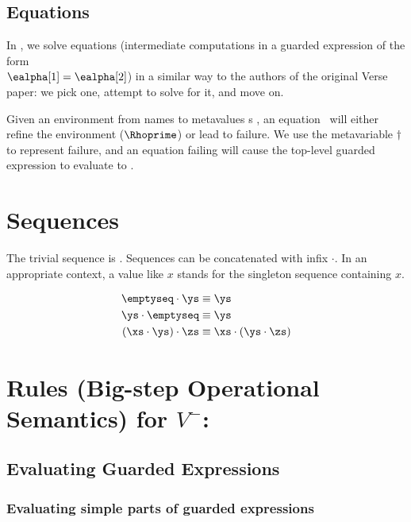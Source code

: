 \documentclass[]{article}
\begin{document}
    \bigskip
\subsection{Equations}

In \Vminus, we solve equations (intermediate computations in a guarded
expression of the form \\$\ealpha[1] = \ealpha[2]$) in a similar way to the
authors of the original Verse paper: we pick one, attempt to solve for it, and
move on. 


Given an environment from names to metavalues {\valpha}s \Rho, an equation \eq
~will either refine the environment ($\Rhoprime$) or lead to failure. We use
the metavariable $\dagger$ to represent failure, and an equation failing will
cause the top-level guarded expression to evaluate to \reject. 

{}\eqfail
    
    
    \section{Sequences}
    
    The trivial sequence is \emptyseq. Sequences can be concatenated with infix 
$\cdot$. In an appropriate context, a value like $x$ stands for 
the singleton sequence containing $x$. 

\begin{align*}
    \emptyseq \cdot \ys &\equiv \ys \\
    \ys \cdot \emptyseq &\equiv \ys \\
    (\xs \cdot \ys) \cdot \zs &\equiv \xs \cdot (\ys \cdot \zs)
\end{align*}

\section{Rules (Big-step Operational Semantics) for $V^{-}$:}
    
\subsection{Evaluating Guarded Expressions}


\subsubsection{Evaluating simple parts of guarded expressions}
\end{document}
